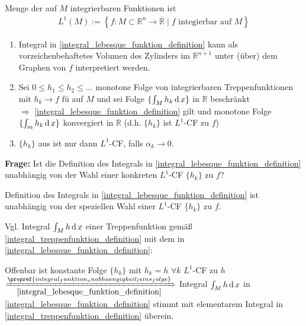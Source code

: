 \begin{*definition}
Menge der auf $M$ integrierbaren Funktionen ist  \begin{align*}
	L^1(M) := \left\{ f:M\subset\mathbb{R}^n\to\overline{\mathbb{R}} \mid f \text{ integierbar auf $M$} \right\}
\end{align*}
\end{*definition}

\begin{remark}\vspace*{0pt}
	\begin{enumerate}[label={\alph*)},topsep=\dimexpr -\baselineskip / 2\relax]
		\item Integral in \eqref{integral_lebesque_funktion_definition} kann als vorzeichenbehaftetes Volumen des Zylinders im $\mathbb{R}^{n+1}$ unter (über) dem Graphen von $f$ interpretiert werden.
		\item Sei $0\le h_1 \le h_2 \le \dotsc$ monotone Folge von integrierbaren Treppenfunktionen mit $h_k\to f$ \gls{fü} auf $M$ und sei Folge $\{ \int_M h_k\operatorname{d} x\}$ in $\mathbb{R}$ beschränkt \\
		$\Rightarrow$ \eqref{integral_lebesque_funktion_definition} gilt und monotone Folge $\{ \int_m h_k \operatorname{d} x \}$ konvergiert in $\mathbb{R}$ (d.h. $\{ h_k \}$ ist $L^1$-CF zu $f$)
		\item $\{ h_k\}$ aus  ist nur dann $L^1$-CF, falls $\alpha_k\to 0$.
	\end{enumerate}
\end{remark}

\textbf{Frage:} Ist die Definition des Integrals in \eqref{integral_lebesque_funktion_definition} unabhängig von der Wahl einer konkreten $L^1$-CF $\{ h_k\}$ zu $f$?

\begin{proposition}
	Definition des Integrals in \eqref{integral_lebesque_funktion_definition} ist unabhängig von der speziellen Wahl einer $L^1$-CF $\{h_k\}$ zu $f$.
\end{proposition}

Vgl. Integral $\int_{M} h \operatorname{d} x$ einer Treppenfunktion gemäß \eqref{integral_treppenfunktion_definition} mit dem in \eqref{integral_lebesque_funktion_definition}:

Offenbar ist konstante Folge $\{ h_k\}$ mit $h_k = h$ $\forall k$ $L^1$-CF zu $h$ \\
$\xRightarrow[\eqref{integral_lebesque_funktion_definition}]{\propref{integral_funktion_unabhaengigkeit_leins_folge}}$ Integral $\int_M h \operatorname{d} x$ in \eqref{integral_lebesque_funktion_definition} stimmt mit elementarem Integral in \eqref{integral_treppenfunktion_definition} überein.

